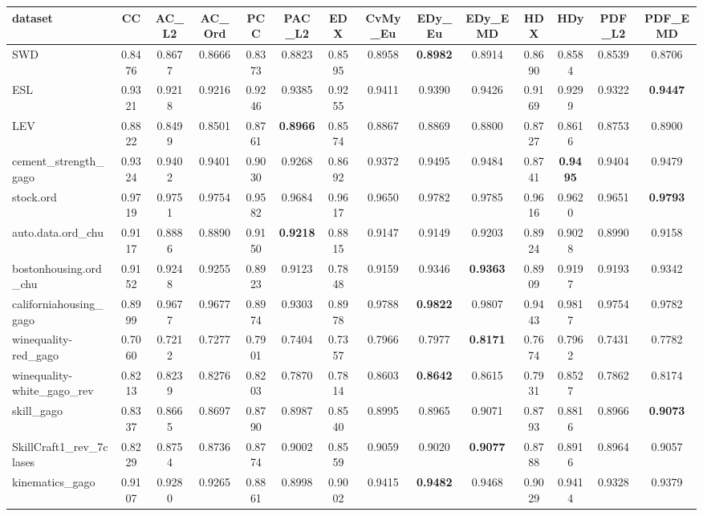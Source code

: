 \begin{tabular}{lccccccccccccc}
\toprule
dataset & CC & AC_L2 & AC_Ord & PCC & PAC_L2 & EDX & CvMy_Eu & EDy_Eu & EDy_EMD & HDX & HDy & PDF_L2 & PDF_EMD \\
\midrule
SWD & 0.8476 & 0.8677 & 0.8666 & 0.8373 & 0.8823 & 0.8595 & 0.8958 & \textbf{0.8982} & 0.8914 & 0.8690 & 0.8584 & 0.8539 & 0.8706 \\
ESL & 0.9321 & 0.9218 & 0.9216 & 0.9246 & 0.9385 & 0.9255 & 0.9411 & 0.9390 & 0.9426 & 0.9169 & 0.9299 & 0.9322 & \textbf{0.9447} \\
LEV & 0.8822 & 0.8499 & 0.8501 & 0.8761 & \textbf{0.8966} & 0.8574 & 0.8867 & 0.8869 & 0.8800 & 0.8727 & 0.8616 & 0.8753 & 0.8900 \\
cement_strength_gago & 0.9324 & 0.9402 & 0.9401 & 0.9030 & 0.9268 & 0.8692 & 0.9372 & 0.9495 & 0.9484 & 0.8741 & \textbf{0.9495} & 0.9404 & 0.9479 \\
stock.ord & 0.9719 & 0.9751 & 0.9754 & 0.9582 & 0.9684 & 0.9617 & 0.9650 & 0.9782 & 0.9785 & 0.9616 & 0.9620 & 0.9651 & \textbf{0.9793} \\
auto.data.ord_chu & 0.9117 & 0.8886 & 0.8890 & 0.9150 & \textbf{0.9218} & 0.8815 & 0.9147 & 0.9149 & 0.9203 & 0.8924 & 0.9028 & 0.8990 & 0.9158 \\
bostonhousing.ord_chu & 0.9152 & 0.9248 & 0.9255 & 0.8923 & 0.9123 & 0.7848 & 0.9159 & 0.9346 & \textbf{0.9363} & 0.8909 & 0.9197 & 0.9193 & 0.9342 \\
californiahousing_gago & 0.8999 & 0.9677 & 0.9677 & 0.8974 & 0.9303 & 0.8978 & 0.9788 & \textbf{0.9822} & 0.9807 & 0.9443 & 0.9817 & 0.9754 & 0.9782 \\
winequality-red_gago & 0.7060 & 0.7212 & 0.7277 & 0.7901 & 0.7404 & 0.7357 & 0.7966 & 0.7977 & \textbf{0.8171} & 0.7674 & 0.7962 & 0.7431 & 0.7782 \\
winequality-white_gago_rev & 0.8213 & 0.8239 & 0.8276 & 0.8203 & 0.7870 & 0.7814 & 0.8603 & \textbf{0.8642} & 0.8615 & 0.7931 & 0.8527 & 0.7862 & 0.8174 \\
skill_gago & 0.8337 & 0.8665 & 0.8697 & 0.8790 & 0.8987 & 0.8540 & 0.8995 & 0.8965 & 0.9071 & 0.8793 & 0.8816 & 0.8966 & \textbf{0.9073} \\
SkillCraft1_rev_7clases & 0.8229 & 0.8754 & 0.8736 & 0.8774 & 0.9002 & 0.8559 & 0.9059 & 0.9020 & \textbf{0.9077} & 0.8788 & 0.8916 & 0.8964 & 0.9057 \\
kinematics_gago & 0.9107 & 0.9280 & 0.9265 & 0.8861 & 0.8998 & 0.9002 & 0.9415 & \textbf{0.9482} & 0.9468 & 0.9029 & 0.9414 & 0.9328 & 0.9379 \\

\end{tabular}
